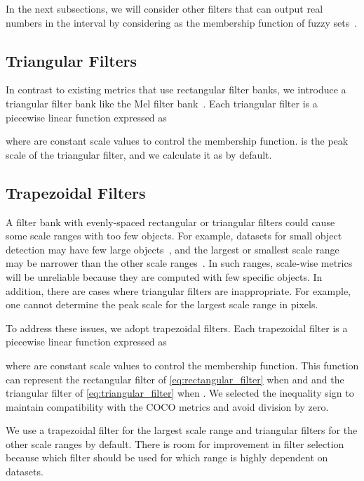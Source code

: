 \documentclass{mva_style}
\begin{document}
In the next subsections,
we will consider other filters that can output real numbers in the interval 
by considering  as the membership function of fuzzy sets~\cite{FuzzySets_Zadeh_1965}.


\subsection{Triangular Filters}

In contrast to existing metrics that use rectangular filter banks, we introduce a triangular filter bank like the Mel filter bank~\cite{MFCC_Davis_1980}.
Each triangular filter is a piecewise linear function expressed as

where  are constant scale values to control the membership function.
 is the peak scale of the triangular filter, and we calculate it as  by default.


\subsection{Trapezoidal Filters}
\label{sec:proposed_metrics_trapezoidal_filters}

A filter bank with evenly-spaced rectangular or triangular filters could cause some scale ranges with too few objects.
For example, datasets for small object detection may have few large objects~\cite{SOD4SB_MVA2023_challenge},
and the largest or smallest scale range may be narrower than the other scale ranges~\cite{USB_Shinya_BMVC2022}.
In such ranges, scale-wise metrics will be unreliable because they are computed with few specific objects.
In addition, there are cases where triangular filters are inappropriate.
For example, one cannot determine the peak scale for the largest scale range  in pixels.

To address these issues, we adopt trapezoidal filters.
Each trapezoidal filter is a piecewise linear function expressed as

where  are constant scale values to control the membership function.
This function can represent the rectangular filter of \cref{eq:rectangular_filter} when  and  and the triangular filter of \cref{eq:triangular_filter} when .
We selected the inequality sign to maintain compatibility with the COCO metrics and avoid division by zero.

We use a trapezoidal filter for the largest scale range and triangular filters for the other scale ranges by default.
There is room for improvement in filter selection because which filter should be used for which range is highly dependent on datasets.
\end{document}
